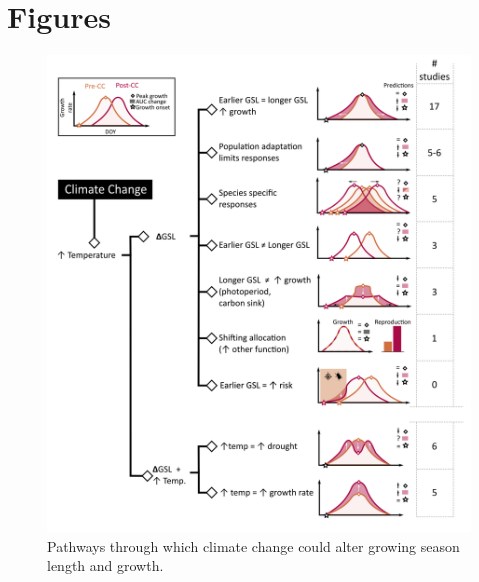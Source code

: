 \documentclass[11pt]{article}
\begin{document}

\newpage
\section{Figures}


\clearpage
\begin{figure}[h!]
\includegraphics[width=1\textwidth]{..//figures/hypothesesconceptfig.png}
\caption{Pathways through which climate change could alter growing season length and growth.}
\label{fig:hypotheses}
\end{figure}
\end{document}
